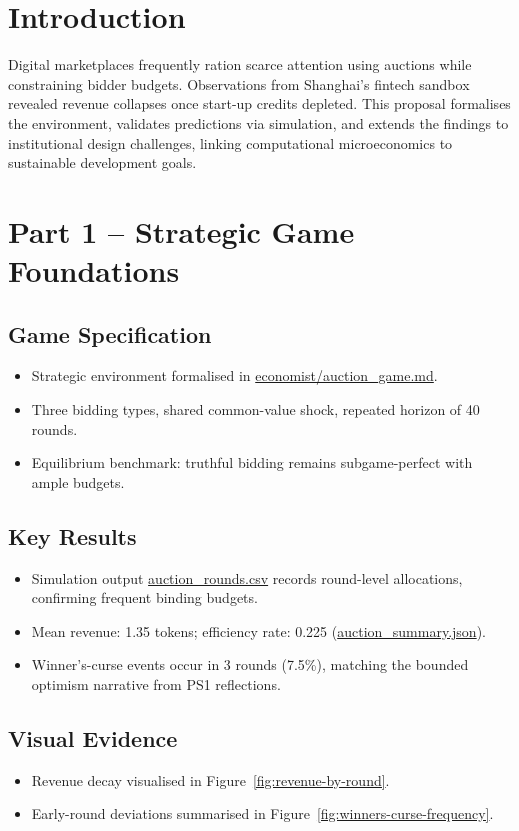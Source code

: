 \documentclass[11pt]{article}
\begin{document}
\section{Introduction}
Digital marketplaces frequently ration scarce attention using auctions while constraining bidder budgets. Observations from Shanghai's fintech sandbox revealed revenue collapses once start-up credits depleted. This proposal formalises the environment, validates predictions via simulation, and extends the findings to institutional design challenges, linking computational microeconomics to sustainable development goals.

\section{Part 1 -- Strategic Game Foundations}
\subsection{Game Specification}
\begin{itemize}[leftmargin=*]
  \item Strategic environment formalised in \href{../economist/auction_game.md}{economist/auction\_game.md}.
  \item Three bidding types, shared common-value shock, repeated horizon of 40 rounds.
  \item Equilibrium benchmark: truthful bidding remains subgame-perfect with ample budgets.
\end{itemize}

\subsection{Key Results}
\begin{itemize}[leftmargin=*]
  \item Simulation output \href{../computational_scientist/results/auction_rounds.csv}{auction\_rounds.csv} records round-level allocations, confirming frequent binding budgets.
  \item Mean revenue: 1.35 tokens; efficiency rate: 0.225 (\href{../computational_scientist/results/auction_summary.json}{auction\_summary.json}).
  \item Winner's-curse events occur in 3 rounds (7.5\%), matching the bounded optimism narrative from PS1 reflections.
\end{itemize}

\subsection{Visual Evidence}
\begin{itemize}[leftmargin=*]
  \item Revenue decay visualised in Figure~\ref{fig:revenue-by-round}.
  \item Early-round deviations summarised in Figure~\ref{fig:winners-curse-frequency}.
\end{itemize}
\end{document}
